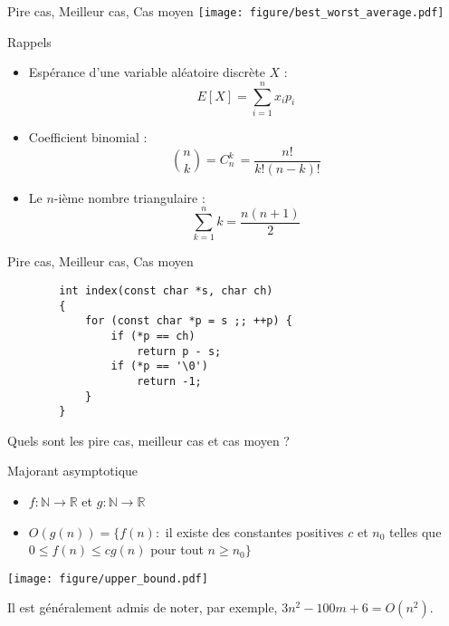 \documentclass[handout]{beamer}
\newcommand{\N}{\mathbb{N}}
\newcommand{\R}{\mathbb{R}}
\begin{document}
\begin{frame}{Pire cas, Meilleur cas, Cas moyen}
    \centering
    \texttt{[image: figure/best\_worst\_average.pdf]} 
\end{frame}

\begin{frame}{Rappels}
\begin{itemize}
    \item Espérance d'une variable aléatoire discrète $X$ :
    $$
    E[X] = \sum_{i = 1}^n x_i p_i
    $$
    \item Coefficient binomial :
    $$
    {n \choose k} = C_n^k\, = \frac{n!}{k!(n-k)!}
    $$
    \item Le $n$-ième nombre triangulaire :
    $$
    \sum_{k=1}^n k = \frac{n(n+1)}{2}
    $$
\end{itemize}
\end{frame}

\begin{frame}[fragile]{Pire cas, Meilleur cas, Cas moyen}
    \begin{lstlisting}
        int index(const char *s, char ch)
        {
            for (const char *p = s ;; ++p) {
                if (*p == ch)
                    return p - s;
                if (*p == '\0')
                    return -1;
            }
        }
    \end{lstlisting}
    Quels sont les pire cas, meilleur cas et cas moyen ?
\end{frame}


\begin{frame}[t]{Majorant asymptotique}
    \begin{itemize}
        \item $f : \N \rightarrow \R$ et $g : \N \rightarrow \R$
        \item $O(g(n)) = \big\{ f(n) :$ il existe des constantes positives $c$ et $n_0$ telles que $0 \leqslant f(n) \leqslant c g(n)$ pour tout $n \geqslant n_0\big\}$
    \end{itemize}
    \begin{center}
        \texttt{[image: figure/upper\_bound.pdf]} 
    \end{center}
    Il est généralement admis de noter, par exemple, $3n^2 - 100m + 6 = O(n^2)$.
\end{frame}
\end{document}

